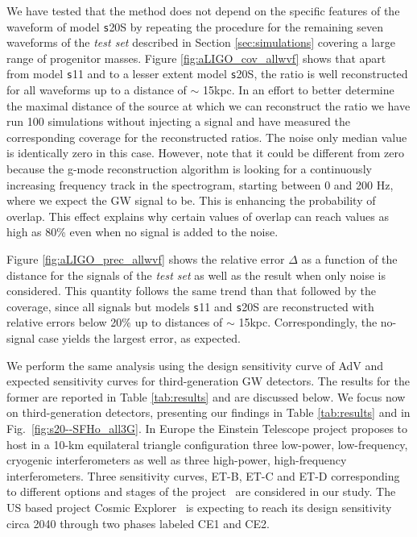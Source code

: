 We have tested that the method does not depend on the specific features of the waveform of model {\texttt s20S} by repeating the procedure for the remaining seven waveforms of the {\it test set} described in Section \ref{sec:simulations} covering
a large range of progenitor masses. Figure \ref{fig:aLIGO_cov_allwvf} shows that apart from model {\texttt s11} and to a lesser extent model {\texttt s20S}, the ratio is well reconstructed for all waveforms up to a distance of $\sim$ 15kpc. In an
effort to better determine the maximal distance of the source at which we can reconstruct the ratio we have run 100 simulations without injecting a signal and have measured the corresponding coverage for the reconstructed ratios.
The noise only median value is identically zero in this case. However, note that it could be different
from zero because
the g-mode reconstruction algorithm is looking for a continuously  increasing frequency track
in the spectrogram, starting between 0 and 200 Hz, where we expect the GW signal to be.
This is enhancing the probability of overlap. This effect explains why certain values of overlap can reach
values as high as 80\% even when no signal is added to the noise.  

Figure \ref{fig:aLIGO_prec_allwvf} shows the relative error $\Delta$ as a function of the distance for the signals of the {\it test set}
as well as the result when only noise is considered. This quantity follows the same trend than that followed by the coverage, since all signals but models {\texttt s11} and {\texttt s20S} are reconstructed with relative errors below 20\% up to distances of $\sim$ 15kpc. Correspondingly, the no-signal case yields the largest error, as expected.

We perform the same analysis using the design sensitivity curve of AdV and expected sensitivity curves for third-generation 
GW detectors. The results for the former are reported in Table \ref{tab:results} and are discussed below. We focus now on third-generation detectors, presenting our findings in Table \ref{tab:results} and in Fig.~\ref{fig:s20--SFHo_all3G}. In Europe the Einstein Telescope project proposes to host in a 10-km equilateral triangle configuration three low-power, low-frequency, cryogenic interferometers as well as three high-power, high-frequency interferometers. Three sensitivity curves, ET-B, ET-C and ET-D corresponding to different options and stages of the project~\cite{Hild_2011} are considered in our study. %
The US based project Cosmic Explorer~\cite{reitze2019cosmic} is expecting to reach its design
sensitivity circa 2040 through two phases labeled CE1 and CE2. %

